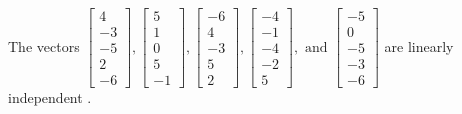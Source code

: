 \begin{exercise}
\begin{exerciseStatement}
  \end{exerciseStatement}
  \begin{exerciseAnswer}
   The vectors \(\left[\begin{array}{r}
4 \\
-3 \\
-5 \\
2 \\
-6
\end{array}\right] , \left[\begin{array}{r}
5 \\
1 \\
0 \\
5 \\
-1
\end{array}\right] , \left[\begin{array}{r}
-6 \\
4 \\
-3 \\
5 \\
2
\end{array}\right] , \left[\begin{array}{r}
-4 \\
-1 \\
-4 \\
-2 \\
5
\end{array}\right] , \text{ and } \left[\begin{array}{r}
-5 \\
0 \\
-5 \\
-3 \\
-6
\end{array}\right]\) are 
  	 linearly independent  .
  


  \end{exerciseAnswer}
\end{exercise}